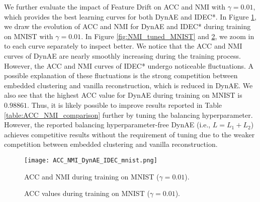 \documentclass{article}
\begin{document}
\begin{figure*}[ht]
\vskip 0.2in
\centering
    \caption{Effect of the balancing hyperparameter during training on MNIST.}
\label{fig:balancing_hyperparameter_MNIST}
\end{figure*}



We further evaluate the impact of Feature Drift on ACC and NMI with $\gamma = 0.01$, which provides the best learning curves for both DynAE and IDEC*. In Figure \ref{fig:ACC_NMI_tunned_mnist}, we draw the evolution of ACC and NMI for DynAE and IDEC* during training on MNIST with $\gamma = 0.01$. In Figure \ref{fig:NMI_tuned_MNIST} and \ref{fig:ACC_tuned_MNIST}, we zoom in to each curve separately to inspect better. We notice that the ACC and NMI curves of DynAE are nearly smoothly increasing during the training process. However, the ACC and NMI curves of IDEC* undergo noticeable fluctuations. A possible explanation of these fluctuations is the strong competition between embedded clustering and vanilla reconstruction, which is reduced in DynAE. We also see that the highest ACC value for DynAE during training on MNIST is $0.98861$. Thus, it is likely possible to improve results reported in Table \ref{table:ACC_NMI_comparison} further by tuning the balancing hyperparameter. However, the reported balancing hyperparameter-free DynAE (i.e., $L = L_{1} + L_{2}$) achieves competitive results without the requirement of tuning due to the weaker competition between embedded clustering and vanilla reconstruction.

\begin{figure}
\vskip 0.2in
\begin{center}
\centerline{\texttt{[image: ACC\_NMI\_DynAE\_IDEC\_mnist.png]}}
\caption{ACC and NMI during training on MNIST ($\gamma = 0.01$).}
\label{fig:ACC_NMI_tunned_mnist}
\end{center}
\vskip -0.2in
\end{figure}

\begin{figure}
\vskip 0.2in
\centering
    \caption{ACC values during training on MNIST ($\gamma = 0.01$).}
\vskip -0.2in
\label{fig:ACC_tuned_MNIST}
\end{figure}
\end{document}
